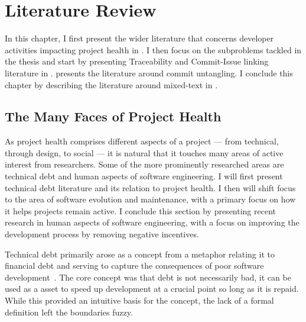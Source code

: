 \chapter{Literature Review}
\label{chapter:literature}

In this chapter, I first present the wider literature that concerns developer
activities impacting project health in
. I then focus on the subproblems
tackled in the thesis and start by presenting Traceability and Commit-Issue
linking literature in .
 presents the literature around
commit untangling. I conclude this chapter by describing the literature around
mixed-text in .

\section{The Many Faces of Project Health}
\label{chapter:literature:sec:project_health}

As project health comprises different aspects of a project --- from technical,
through design, to social --- it is natural that it touches many areas of active
interest from researchers. Some of the more prominently researched areas are
technical debt and human aspects of software engineering. I will first present
technical debt literature and its relation to project health. I then will shift
focus to the area of software evolution and maintenance, with a primary focus on
how it helps projects remain active. I conclude this section by presenting
recent research in human aspects of software engineering, with a focus on
improving the development process by removing negative incentives.

Technical debt primarily arose as a concept from a metaphor relating it to
financial debt and serving to capture the consequences of poor software
development~\cite{cunningham1992wycash}. The core concept was that debt is not
necessarily bad, it can be used as a asset to speed up development at a crucial
point so long as it is repaid. While this provided an intuitive basis for the
concept, the lack of a formal definition left the boundaries fuzzy. 

